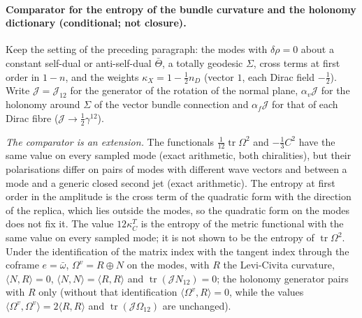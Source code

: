 \paragraph{Comparator for the entropy of the bundle curvature and the holonomy dictionary (conditional; not closure).}
Keep the setting of the preceding paragraph: the modes with \(\delta\rho=0\) about a constant self-dual or anti-self-dual \(\bar\Theta\), a totally geodesic \(\Sigma\), cross terms at first order in \(1-n\), and the weights \(\kappa_X=1-\tfrac12n_D\) (vector \(1\), each Dirac field \(-\tfrac12\)). Write \(\mathcal J=\mathcal J_{12}\) for the generator of the rotation of the normal plane, \(\alpha_v\mathcal J\) for the holonomy around \(\Sigma\) of the vector bundle connection and \(\alpha_f\mathcal J\) for that of each Dirac fibre (\(\mathcal J\to\tfrac12\gamma^{12}\)).

\emph{The comparator is an extension.} The functionals \(\tfrac1{12}\operatorname{tr}\Omega^2\) and \(-\tfrac13C^2\) have the same value on every sampled mode (exact arithmetic, both chiralities), but their polarisations differ on pairs of modes with different wave vectors and between a mode and a generic closed second jet (exact arithmetic). The entropy at first order in the amplitude is the cross term of the quadratic form with the direction of the replica, which lies outside the modes, so the quadratic form on the modes does not fix it. The value \(12\kappa_C^T\) is the entropy of the metric functional with the same value on every sampled mode; it is not shown to be the entropy of \(\operatorname{tr}\Omega^2\). Under the identification of the matrix index with the tangent index through the coframe \(e=\bar\omega\), \(\Omega^v=R\oplus N\) on the modes, with \(R\) the Levi-Civita curvature, \(\langle N,R\rangle=0\), \(\langle N,N\rangle=\langle R,R\rangle\) and \(\operatorname{tr}(\mathcal J N_{12})=0\); the holonomy generator pairs with \(R\) only (without that identification \(\langle\Omega^v,R\rangle=0\), while the values \(\langle\Omega^v,\Omega^v\rangle=2\langle R,R\rangle\) and \(\operatorname{tr}(\mathcal J\Omega_{12})\) are unchanged).

